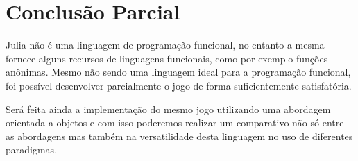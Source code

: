 \documentclass[rel_mlp]{iiufrgs}
\begin{document}
\chapter{Conclusão Parcial}
    
    Julia não é uma linguagem de programação funcional, no entanto a mesma fornece alguns recursos de linguagens funcionais, como por exemplo funções anônimas. 
    Mesmo não sendo uma linguagem ideal para a programação funcional, foi possível desenvolver parcialmente o jogo de forma suficientemente satisfatória. 
    
    Será feita ainda a implementação do mesmo jogo utilizando uma abordagem orientada a objetos e com isso poderemos realizar um comparativo não só entre as abordagens mas também na versatilidade desta linguagem no uso de diferentes paradigmas.
















\end{document}

